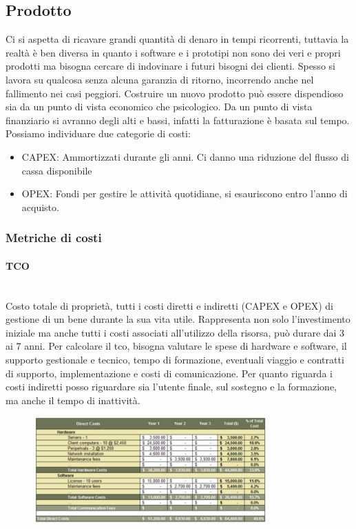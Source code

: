 \documentclass{article}
\begin{document}
		\subsection{Prodotto}
		Ci si aspetta di ricavare grandi quantità di denaro in tempi ricorrenti, tuttavia la realtà è ben diversa in quanto i software e i prototipi non sono dei veri e propri prodotti ma bisogna cercare di indovinare i futuri bisogni dei clienti. 
		Spesso si lavora su qualcosa senza alcuna garanzia di ritorno, incorrendo anche nel fallimento nei casi peggiori. Costruire un nuovo prodotto può essere dispendioso sia da un punto di vista economico che psicologico.
		Da un punto di vista finanziario si avranno degli alti e bassi, infatti la fatturazione è basata sul tempo.\\
		Possiamo individuare due categorie di costi:
		\begin{itemize}
			\item CAPEX: Ammortizzati durante gli anni. Ci danno una riduzione del flusso di cassa disponibile
			\item OPEX: Fondi per gestire le attività quotidiane, si esauriscono entro l'anno di acquisto.
		\end{itemize}
		
		\subsubsection{Metriche di costi}
		\paragraph{TCO} \mbox{}\\
		Costo totale di proprietà, tutti i costi diretti e indiretti (CAPEX e OPEX) di gestione di un bene durante la sua vita utile.
		Rappresenta non solo l'investimento iniziale ma anche tutti i costi associati all'utilizzo della risorsa, può durare dai 3 ai 7 anni.
		Per calcolare il tco, bisogna valutare le spese di hardware e software, il supporto gestionale e tecnico, tempo di formazione, eventuali viaggio e contratti di supporto, implementazione e costi di comunicazione.
		Per quanto riguarda i costi indiretti posso riguardare sia l'utente finale, sul sostegno e la formazione, ma anche il tempo di inattività.
		\begin{figure}[ht]
			\centering
			\includegraphics[width=0.8\textwidth]{SAC_D1_TCOExample.png}
		\end{figure}
		
\end{document}
